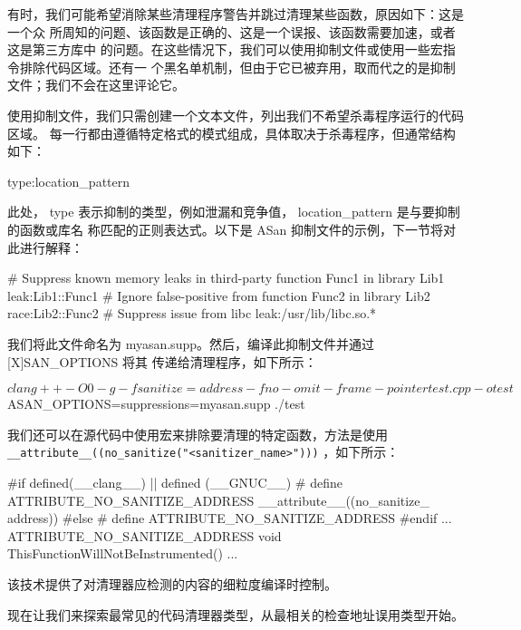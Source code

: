 
有时，我们可能希望消除某些清理程序警告并跳过清理某些函数，原因如下：这是一个众
所周知的问题、该函数是正确的、这是一个误报、该函数需要加速，或者这是第三方库中
的问题。在这些情况下，我们可以使用抑制文件或使用一些宏指令排除代码区域。还有一
个黑名单机制，但由于它已被弃用，取而代之的是抑制文件；我们不会在这里评论它。

使用抑制文件，我们只需创建一个文本文件，列出我们不希望杀毒程序运行的代码区域。
每一行都由遵循特定格式的模式组成，具体取决于杀毒程序，但通常结构如下：

\begin{shell}
type:location_pattern
\end{shell}

此处， type 表示抑制的类型，例如泄漏和竞争值， location\_pattern 是与要抑制的函数或库名
称匹配的正则表达式。以下是 ASan 抑制文件的示例，下一节将对此进行解释：

\begin{shell}
# Suppress known memory leaks in third-party function Func1 in library
Lib1
leak:Lib1::Func1
# Ignore false-positive from function Func2 in library Lib2
race:Lib2::Func2
# Suppress issue from libc
leak:/usr/lib/libc.so.*
\end{shell}

我们将此文件命名为 myasan.supp。然后，编译此抑制文件并通过 [X]SAN\_OPTIONS 将其
传递给清理程序，如下所示：

\begin{shell}
$ clang++ -O0 -g -fsanitize=address -fno-omit-frame-pointer test.cpp -o test
$ ASAN_OPTIONS=suppressions=myasan.supp ./test
\end{shell}

我们还可以在源代码中使用宏来排除要清理的特定函数，方法是使用 \verb|__attribute__((no_sanitize("<sanitizer_name>")))| ，如下所示：

\begin{cpp}
#if defined(__clang__) || defined (__GNUC__)
# define ATTRIBUTE_NO_SANITIZE_ADDRESS __attribute__((no_sanitize_
address))
#else
# define ATTRIBUTE_NO_SANITIZE_ADDRESS
#endif
...
ATTRIBUTE_NO_SANITIZE_ADDRESS
void ThisFunctionWillNotBeInstrumented() {...}
\end{cpp}

该技术提供了对清理器应检测的内容的细粒度编译时控制。

现在让我们来探索最常见的代码清理器类型，从最相关的检查地址误用类型开始。


